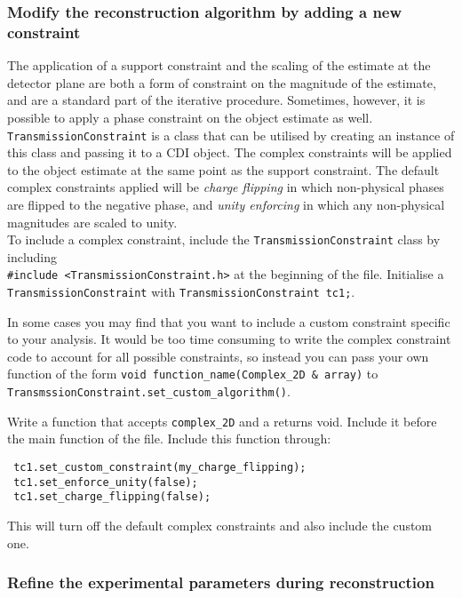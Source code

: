\documentclass[]{nadia}
\begin{document}
\subsubsection{Modify the reconstruction algorithm by adding a new constraint}

The application of a support constraint and the scaling of the estimate at the detector plane are both a form of constraint on the magnitude of the estimate, and are a standard part of the iterative procedure. Sometimes, however, it is possible to apply a phase constraint on the object estimate as well. {\tt TransmissionConstraint} is a class that can be utilised by creating an instance of this class and passing it to a CDI object. The complex constraints will be applied to the object estimate at the same point as the support constraint. The default complex constraints applied will be \emph{charge flipping} in which non-physical phases are flipped to the negative phase, and \emph{unity enforcing} in which any non-physical magnitudes are scaled to unity.\\

To include a complex constraint, include the {\tt TransmissionConstraint} class by including\\ {\tt {\#}include <TransmissionConstraint.h>} at the beginning of the file. Initialise a {\tt TransmissionConstraint} with {\tt TransmissionConstraint tc1;}.

In some cases you may find that you want to include a custom constraint specific to your analysis. It would be too time consuming to write the complex constraint code to account for all possible constraints, so instead you can pass your own function of the form {\tt void function\_name(Complex\_2D {\&} array)} to \\
{\tt TransmssionConstraint.set\_custom\_algorithm()}.

Write a function that accepts {\tt complex\_2D} and a returns void. Include it before the main function of the file. Include this function through:\\

\begin{verbatim}
 tc1.set_custom_constraint(my_charge_flipping);
 tc1.set_enforce_unity(false);
 tc1.set_charge_flipping(false);
\end{verbatim}
This will turn off the default complex constraints and also include the custom one.

\subsubsection{Refine the experimental parameters during reconstruction}
\end{document}
